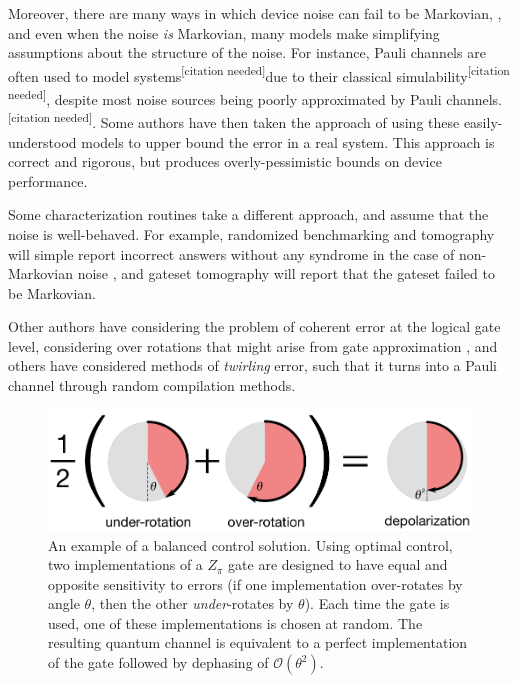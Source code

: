 \documentclass[aps,nofootinbib,pra,notitlepage,twocolumn]{revtex4-1}
\newcommand{\order}[1]{\mathcal{O}\left( #1 \right)}
\newcommand{\needcite}{{\color{blue}\textsuperscript{[citation needed]}}}
\begin{document}
Moreover, there are many ways in which device noise can fail to be Markovian, \cite{Kelly2018, BlumeKohout2017, Klimov2018}, and even when the noise \textit{is} Markovian, many models make simplifying assumptions about the structure of the noise. For instance, Pauli channels are often used to model systems\needcite due to their classical simulability\needcite, despite most noise sources being poorly approximated by Pauli channels.\needcite. Some authors have then taken the approach of using these easily-understood models to upper bound the error in a real system\cite{Puzzuoli2014}. This approach is correct and rigorous, but produces overly-pessimistic bounds on device performance.

Some characterization routines take a different approach, and assume that the noise is well-behaved. For example, randomized benchmarking and tomography will simple report incorrect answers without any syndrome in the case of non-Markovian noise \cite{Merkel2013}, and gateset tomography will report that the gateset failed to be Markovian.

Other authors have considering the problem of coherent error at the logical gate level, considering over rotations that might arise from gate approximation \cite{Campbell2017, 1612.01011}, and others have considered methods of \textit{twirling} error, such that it turns into a Pauli channel through random compilation methods\cite{Wallman2016, Ware2018}. 

\begin{figure}
  \centering
  \includegraphics[width=\columnwidth]{simple_example.pdf}
  \caption{An example of a balanced control solution. Using optimal control, two implementations of a $Z_\pi$ gate are designed to have equal and opposite sensitivity to errors (if one implementation over-rotates by angle $\theta$, then the other \emph{under}-rotates by $\theta$). Each time the gate is used, one of these implementations is chosen at random. The resulting quantum channel is equivalent to a perfect implementation of the gate followed by dephasing of $\order{\theta^2}$.}
  \label{fig:simple_example}
\end{figure}
\end{document}
